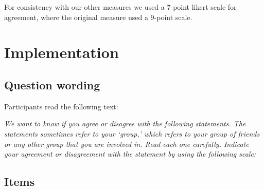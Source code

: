 \documentclass[
  letterpaper,
]{scrbook}
\begin{document}
For consistency with our other measures we used a 7-point likert scale
for agreement, where the original measure used a 9-point scale.

\section{Implementation}\label{implementation-3}

\subsection*{Question wording}\label{question-wording-3}

Participants read the following text:

\emph{We want to know if you agree or disagree with the following
statements. The statements sometimes refer to your `group,' which refers
to your group of friends or any other group that you are involved in.
Read each one carefully. Indicate your agreement or disagreement with
the statement by using the following scale:}

\subsection*{Items}\label{items-3}
\end{document}
